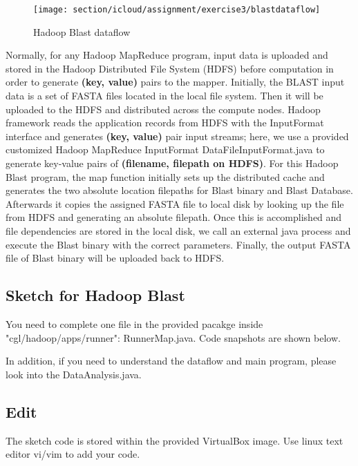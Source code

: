 \begin{figure}[!htbp]
\centering
\texttt{[image: section/icloud/assignment/exercise3/blastdataflow]}
\caption{Hadoop Blast dataflow}
\label{fig:blastdataflow}
\end{figure}

Normally, for any Hadoop MapReduce program, input data is uploaded and stored
in the Hadoop Distributed File System (HDFS) before computation in order to
generate \textbf{(key, value)} pairs to the mapper. Initially, the BLAST input
data is a set of FASTA files located in the local file system. Then it will be
uploaded to the HDFS and distributed across the compute nodes. Hadoop framework
reads the application records from HDFS with the InputFormat interface and
generates \textbf{(key, value)} pair input streams; here, we use a provided
customized Hadoop MapReduce InputFormat DataFileInputFormat.java to generate
key-value pairs of \textbf{(filename, filepath on HDFS)}. For this Hadoop Blast
program, the map function initially sets up the distributed cache and generates
the two absolute location filepaths for Blast binary and Blast Database.
Afterwards it copies the assigned FASTA file to local disk by looking up the
file from HDFS and generating an absolute filepath. Once this is accomplished
and file dependencies are stored in the local disk, we call an external java
process and execute the Blast binary with the correct parameters. Finally, the
output FASTA file of Blast binary will be uploaded back to HDFS.

\subsection*{Sketch for Hadoop Blast}
You need to complete one file in the provided pacakge inside
"cgl/hadoop/apps/runner": RunnerMap.java. Code snapshots are shown below.



In addition, if you need to understand the dataflow and main program, please
look into the DataAnalysis.java.




\subsection*{Edit}
The sketch code is stored within the provided VirtualBox image. Use linux text
editor vi/vim to add your code.

